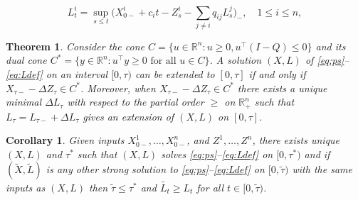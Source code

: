 \documentclass[10pt,a4paper]{amsart}
\newtheorem{theorem}{Theorem}
\newtheorem{corollary}{Corollary}
\newcommand{\R}{\mathbb{R}}
\newcommand{\wt}{\widetilde}
\begin{document}
\begin{equation}\label{eq:Ldef}
L_t^i=\sup_{s\le t}\bigg(X_{0-}^i+c_it-Z_s^i-\sum_{j\neq i}q_{ij}L_s^j\bigg)_-,\quad 1\le i\le n,
\end{equation}

\begin{theorem}\label{thm}
Consider the cone $C=\{u\in\R^n:u\ge 0, u^\top (I-Q)\le 0\}$ and its dual cone $C^*=\{y\in\R^n:u^\top y \ge 0 \text{ for all }u\in C\}$.
A solution $(X,L)$ of \eqref{eq:ps}--\eqref{eq:Ldef} on an interval $[0,\tau)$ can be extended to $[0,\tau]$ if and only if $X_{\tau-}-\Delta Z_\tau \in C^*$. Moreover, when $X_{\tau-}-\Delta Z_\tau \in C^*$ there exists a unique minimal $\Delta L_\tau$ with respect to the partial order $\ge$ on $\R_+^n$ such that $L_\tau=L_{\tau-}+\Delta L_\tau$ gives an extension of $(X,L)$ on $[0,\tau]$.
\end{theorem}

\begin{corollary}\label{coro}
Given inputs $X_{0-}^1,\dots, X_{0-}^n$, and $Z^1,\dots,Z^n$, there exists unique $(X,L)$ and $\tau^*$ such that $(X,L)$ solves \eqref{eq:ps}--\eqref{eq:Ldef} on $[0,\tau^*)$ and if $(\wt{X},\wt{L})$ is any other strong solution to \eqref{eq:ps}--\eqref{eq:Ldef} on $[0,\wt\tau)$ with the same inputs as $(X,L)$ then $\wt\tau\le\tau^*$ and $\wt{L_t}\ge L_t$ for all $t\in[0,\wt\tau)$.
\end{corollary}
\end{document}
